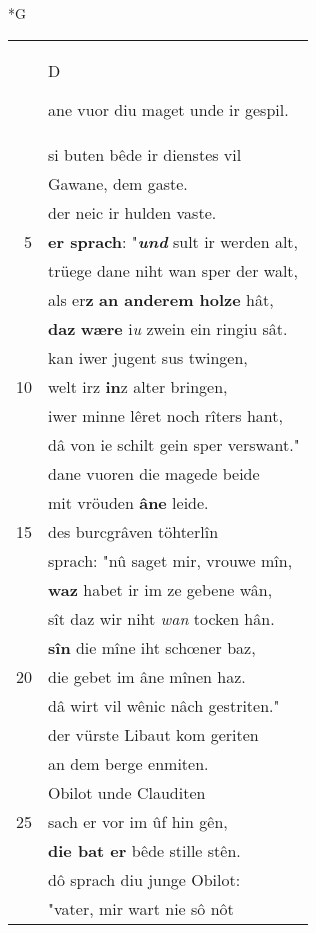 \documentclass[8pt,a4paper,notitlepage]{article}
\begin{document}
\begin{table}[ht]
\begin{minipage}[t]{0.5\linewidth}
\small
\begin{center}*G
\end{center}
\begin{tabular}{rl}
 & \begin{large}D\end{large}ane vuor diu maget unde ir gespil.\\ 
 & si buten bêde ir dienstes vil\\ 
 & Gawane, dem gaste.\\ 
 & der neic ir hulden vaste.\\ 
5 & \textbf{er sprach}: "\textit{\textbf{und}} sult ir werden alt,\\ 
 & trüege dane niht wan sper der walt,\\ 
 & als er\textbf{z} \textbf{an anderem holze} hât,\\ 
 & \textbf{daz} \textbf{wære} i\textit{u} zwein ein ringiu sât.\\ 
 & kan iwer jugent sus twingen,\\ 
10 & welt irz \textbf{in}z alter bringen,\\ 
 & iwer minne lêret noch rîters hant,\\ 
 & dâ von ie schilt gein sper verswant."\\ 
 & dane vuoren die magede beide\\ 
 & mit vröuden \textbf{âne} leide.\\ 
15 & des burcgrâven töhterlîn\\ 
 & sprach: "nû saget mir, vrouwe mîn,\\ 
 & \textbf{waz} habet ir im ze gebene wân,\\ 
 & sît daz wir niht \textit{wan} tocken hân.\\ 
 & \textbf{sîn} die mîne iht schœner baz,\\ 
20 & die gebet im âne mînen haz.\\ 
 & dâ wirt vil wênic nâch gestriten."\\ 
 & der vürste Libaut kom geriten\\ 
 & an dem berge enmiten.\\ 
 & Obilot unde Clauditen\\ 
25 & sach er vor im ûf hin gên,\\ 
 & \textbf{die bat er} bêde stille stên.\\ 
 & dô sprach diu junge Obilot:\\ 
 & "vater, mir wart nie sô nôt\\ 

\end{tabular}
\end{minipage}
\end{table}
\end{document}
